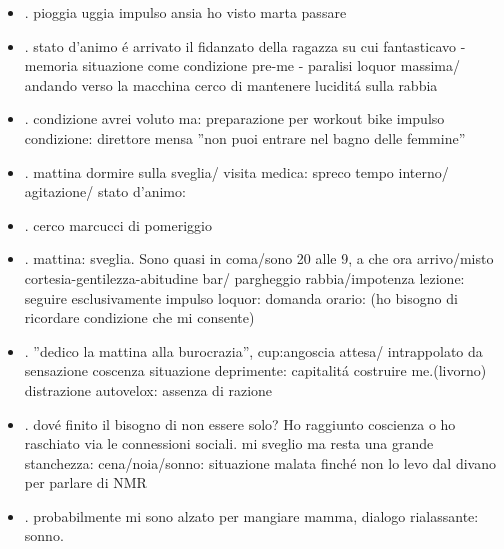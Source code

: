 \begin{itemize}
\item {}.
pioggia uggia
impulso ansia ho visto marta passare
\item {}.
stato d'animo \'e arrivato il fidanzato della ragazza su cui fantasticavo - memoria situazione come condizione pre-me - paralisi loquor massima/
andando verso la macchina cerco di mantenere lucidit\'a sulla rabbia
\item {}.
condizione avrei voluto ma: preparazione per workout bike
impulso condizione: direttore mensa ''non puoi entrare nel bagno delle femmine''
\item {}.
mattina dormire sulla sveglia/
visita medica: spreco tempo interno/ agitazione/ 
stato d'animo: 
\item {}.
cerco marcucci di pomeriggio
\item {}.
mattina: sveglia. Sono quasi in coma/sono 20 alle 9, a che ora arrivo/misto cortesia-gentilezza-abitudine bar/ pargheggio rabbia/impotenza
lezione: seguire esclusivamente
impulso loquor: domanda orario: (ho bisogno di ricordare condizione che mi consente) 
\item {}.
''dedico la mattina alla burocrazia'', cup:angoscia attesa/
intrappolato da sensazione coscenza situazione deprimente: capitalit\'a costruire me.(livorno)
distrazione autovelox: assenza di razione
\item {}.
dov\'e finito il bisogno di non essere solo? Ho raggiunto coscienza o ho raschiato via le connessioni sociali.
mi sveglio ma resta una grande stanchezza: 
cena/noia/sonno: situazione malata finch\'e non lo levo dal divano per parlare di NMR
\item {}.
probabilmente mi sono alzato per mangiare
mamma, dialogo rialassante: sonno. 

\end{itemize}
